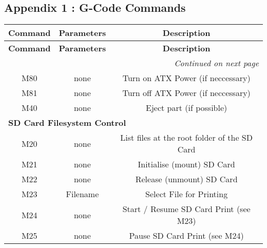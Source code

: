 \newpage
\begin{landscape}
\vspace*{-2cm}
\section{Appendix 1 : G-Code Commands}%
\begin{longtable}{c|c|c}
\pagebreak \hline \hline  \textbf{Command} & \textbf{Parameters} & \textbf{Description} \\
\endfirsthead 
\hline \hline  \textbf{Command} & \textbf{Parameters} & \textbf{Description} \\
\hline
\endhead
\hline \multicolumn{3}{r}{\emph{Continued on next page}}
\endfoot
\endlastfoot

\hline  \multicolumn{3}{l}{\textbf{Power Control}} \\
  M80	& none	& Turn on ATX Power (if neccessary)\\
  M81 	& none & Turn off ATX Power (if neccessary)\\
  M40	& none & Eject part (if possible) \\
  \hline \multicolumn{3}{l}{\textbf{SD Card Filesystem Control}} \\
  M20 	& none	& List files at the root folder of the SD Card \\
  M21	& none  & Initialise (mount) SD Card \\
  M22	& none  & Release (unmount) SD Card \\
  M23	& Filename & Select File for Printing \\
  M24	& none 	& Start / Resume SD Card Print (see M23) \\
  M25	& none & Pause SD Card Print (see M24) \\
  

\end{longtable}
\end{landscape}
